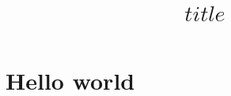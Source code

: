 \documentclass{article}
\title{$title$}
\begin{document}
\maketitle

\section{Hello world}
\end{document}
